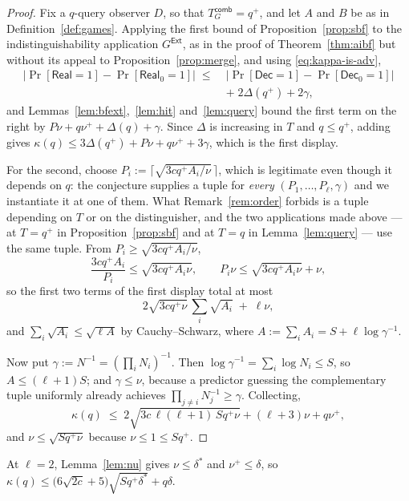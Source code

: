 \documentclass{conjura-conjecture}
\newcommand{\Prob}[1]{\Pr\!\left[#1\right]}
\newcommand{\Real}{\mathsf{Real}}
\newcommand{\Dec}{\mathsf{Dec}}
\newcommand{\Tcomb}{T^{\mathsf{comb}}_{G}}
\newcommand{\Ext}{\mathsf{Ext}}
\begin{document}
\begin{proof}
Fix a $q$-query observer $D$, so that $\Tcomb = q^{+}$, and let $A$ and
$B$ be as in Definition~\ref{def:games}. Applying the first bound of
Proposition~\ref{prop:sbf} to the indistinguishability application
$G^{\Ext}$, as in the proof of Theorem~\ref{thm:aibf} but without its
appeal to Proposition~\ref{prop:merge}, and using
\eqref{eq:kappa-is-adv},
\[
\begin{aligned}
  \bigl|\Prob{\Real{=}1}-\Prob{\Real_0{=}1}\bigr|
  \;\le\;& \bigl|\Prob{\Dec{=}1}-\Prob{\Dec_0{=}1}\bigr| \\
  &+\; 2\Delta(q^{+}) + 2\gamma ,
\end{aligned}
\]
and Lemmas~\ref{lem:bfext},~\ref{lem:hit} and~\ref{lem:query} bound the
first term on the right by $P\nu + q\nu^{+} + \Delta(q) + \gamma$. Since
$\Delta$ is increasing in $T$ and $q \le q^{+}$, adding gives
$\kappa(q) \le 3\Delta(q^{+}) + P\nu + q\nu^{+} + 3\gamma$, which is the
first display.

For the second, choose $P_i := \lceil\sqrt{3cq^{+}A_i/\nu}\,\rceil$, which
is legitimate even though it depends on $q$: the conjecture supplies a
tuple for \emph{every} $(P_1,\dots,P_\ell,\gamma)$ and we instantiate it
at one of them. What Remark~\ref{rem:order} forbids is a tuple depending
on $T$ or on the distinguisher, and the two applications made above --- at
$T = q^{+}$ in Proposition~\ref{prop:sbf} and at $T = q$ in
Lemma~\ref{lem:query} --- use the same tuple. From
$P_i \ge \sqrt{3cq^{+}A_i/\nu}$,
\[
  \frac{3cq^{+}A_i}{P_i} \le \sqrt{3cq^{+}A_i\nu},
  \qquad
  P_i\nu \le \sqrt{3cq^{+}A_i\nu} + \nu ,
\]
so the first two terms of the first display total at most
\[
  2\sqrt{3cq^{+}\nu}\,\sum_i \sqrt{A_i} \;+\; \ell\nu ,
\]
and $\sum_i\sqrt{A_i} \le \sqrt{\ell A}$ by Cauchy--Schwarz, where
$A := \sum_i A_i = S + \ell\log\gamma^{-1}$.

Now put $\gamma := N^{-1} = (\prod_i N_i)^{-1}$. Then
$\log\gamma^{-1} = \sum_i \log N_i \le S$, so $A \le (\ell+1)S$; and
$\gamma \le \nu$, because a predictor guessing the complementary tuple
uniformly already achieves $\prod_{j\ne i}N_j^{-1} \ge \gamma$.
Collecting,
\[
  \kappa(q) \;\le\; 2\sqrt{3c\,\ell(\ell+1)\,Sq^{+}\nu}
  + (\ell+3)\nu + q\nu^{+} ,
\]
and $\nu \le \sqrt{Sq^{+}\nu}$ because $\nu \le 1 \le Sq^{+}$.
\end{proof}

\begin{corollary}\label{cor:two}
At $\ell = 2$, Lemma~\ref{lem:nu} gives $\nu \le \delta^{\ast}$ and
$\nu^{+} \le \delta$, so
$\kappa(q) \le \bigl(6\sqrt{2c}+5\bigr)\sqrt{S q^{+}\delta^{\ast}} +
q\delta$.
\end{corollary}
\end{document}
